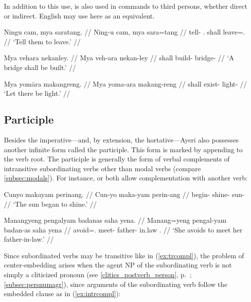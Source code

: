 In addition to this use,  is also used in commands to third 
persons, whether direct or indirect. English may use  here as an 
equivalent.

\pex
\a\begingl
	\gla Ningu cam, mya saratang. //
	\glb Ning-u cam, mya sara=tang //
	\glc tell-\Imp{} \TplM{}.\Dat{} shall leave=\TplM{}.\Aarg{} //
	\glft `Tell them to leave.' //
\endgl

\a\begingl
	\gla Mya vehara nekanley. //
	\glb Mya veh-ara nekan-ley //
	\glc shall build-\TsgI{} bridge-\PargI{} //
	\glft `A bridge shall be built.' //
\endgl

\a\begingl
	\gla Mya yomāra makangreng. //
	\glb Mya yoma-ara makang-reng //
	\glc shall exist-\TsgI{} light-\AargI{} //
	\glft `Let there be light.' //
\endgl
\xe


\subsection{Participle}
\label{subsec:participle}
Besides the imperative---and, by extension, the hortative---Ayeri also 
possesses another infinite form called the participle. This form is marked by 
appending  to the verb root. The participle is generally the 
form of verbal complements of intransitive subordinating verbs other than 
modal verbs (compare \autoref{subsec:modals}). For instance,  
 or  both allow 
complementation with another verb:

\pex
\a\label{ex:intrcompl}\begingl
	\gla Cunyo makayam perinang. // 
	\glb Cun-yo maka-yam perin-ang // 
	\glc begin-\TsgN{} shine-\Ptcp{} sun-\Aarg{} //
	\glft `The sun began to shine.' //
\endgl

\a\label{ex:trcompl}\begingl
	\gla Manangyeng pengalyam badanas saha yena. //
	\glb Manang=yeng pengal-yam badan-as saha yena //
	\glc avoid=\TsgF{}.\Aarg{} meet-\Ptcp{} father-\Parg{} in.law 
		\TsgF{}.\Gen{} //
	\glft `She avoids to meet her father-in-law.' //
\endgl
\xe

Since subordinated verbs may be transitive like in (\ref{ex:trcompl}), the
problem of center-embedding arises when the agent NP of the subordinating verb
is not simply a cliticized pronoun (see \autoref{clitics_postverb_person},
p.~\pageref{clitics_postverb_person}; \ref{subsec:persnumagr}), since
arguments of the subordinating verb follow the embedded clause as in
(\ref{ex:intrcompl}):

